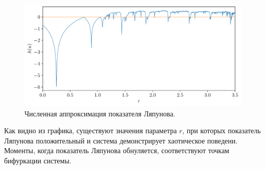 \documentclass[12pt, a4paper]{article} %
\begin{document}
\begin{figure}[ht]
    \centering
    \includegraphics[width=\textwidth]{figures/lyap.pdf}
    \caption{Численная аппроксимация показателя Ляпунова.}
    \label{fig:lyap}
\end{figure}

Как видно из графика, существуют значения параметра $r$, при которых показатель Ляпунова положительный и система демонстрирует хаотическое поведени.
Моменты, когда показатель Ляпунова обнуляется, соответствуют точкам бифуркации системы.



 
\end{document}
